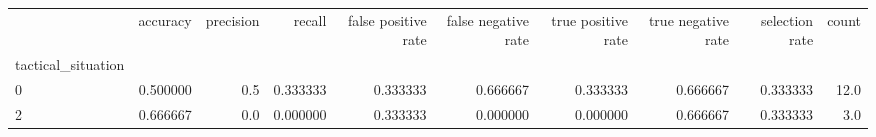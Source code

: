 \begin{tabular}{lrrrrrrrrr}
\toprule
{} &  accuracy &  precision &    recall &  false positive rate &  false negative rate &  true positive rate &  true negative rate &  selection rate &  count \\
tactical\_situation &           &            &           &                      &                      &                     &                     &                 &        \\
\midrule
0                  &  0.500000 &        0.5 &  0.333333 &             0.333333 &             0.666667 &            0.333333 &            0.666667 &        0.333333 &   12.0 \\
2                  &  0.666667 &        0.0 &  0.000000 &             0.333333 &             0.000000 &            0.000000 &            0.666667 &        0.333333 &    3.0 \\
\bottomrule
\end{tabular}
